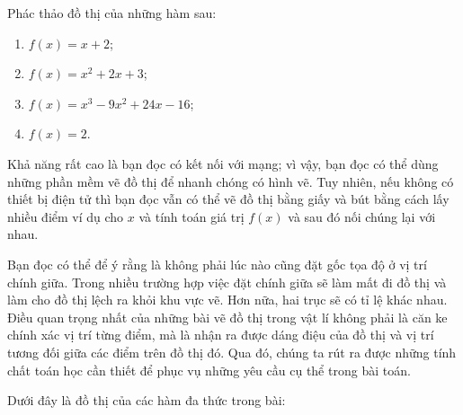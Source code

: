 \exercise Phác thảo đồ thị của những hàm sau:
\begin{multicols}{2}
\begin{enumerate}
   \item $f(x) = x + 2$; 
   \item $f(x) = x^2 + 2x + 3$;
   \item $f(x) = x^3 - 9x^2 + 24x - 16$;
   \item $f(x) = 2$.
\end{enumerate}
\end{multicols}

\solution

Khả năng rất cao là bạn đọc có kết nối với mạng; vì vậy, bạn đọc có thể dùng những phần mềm vẽ đồ thị để nhanh chóng có hình vẽ. Tuy nhiên, nếu không có thiết bị điện tử thì bạn đọc vẫn có thể vẽ đồ thị bằng giấy và bút bằng cách lấy nhiều điểm ví dụ cho $x$ và tính toán giá trị $f(x)$ và sau đó nối chúng lại với nhau.

Bạn đọc có thể để ý rằng là không phải lúc nào cũng đặt gốc tọa độ ở vị trí chính giữa. Trong nhiều trường hợp việc đặt chính giữa sẽ làm mất đi đồ thị và làm cho đồ thị lệch ra khỏi khu vực vẽ. Hơn nữa, hai trục sẽ có tỉ lệ khác nhau. Điều quan trọng nhất của những bài vẽ đồ thị trong vật lí không phải là căn ke chính xác vị trí từng điểm, mà là nhận ra được dáng điệu của đồ thị và vị trí tương đối giữa các điểm trên đồ thị đó. Qua đó, chúng ta rút ra được những tính chất toán học cần thiết để phục vụ những yêu cầu cụ thể trong bài toán.

Dưới đây là đồ thị của các hàm đa thức trong bài:

